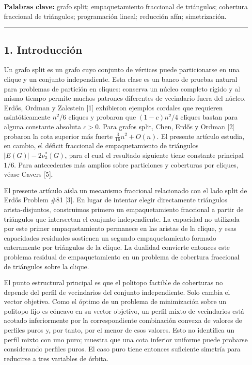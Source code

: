 \documentclass[spanish,11pt,a4paper]{article}
\begin{document}
\textbf{Palabras clave:} grafo split; empaquetamiento fraccional de
triángulos; cobertura fraccional de triángulos; programación lineal;
reducción afín; simetrización.

\begin{center}\rule{0.5\linewidth}{0.5pt}\end{center}

\subsection{1. Introducción}\label{introducciuxf3n}

Un grafo split es un grafo cuyo conjunto de vértices puede particionarse
en una clique y un conjunto independiente. Esta clase es un banco de
pruebas natural para problemas de partición en cliques: conserva un
núcleo completo rígido y al mismo tiempo permite muchos patrones
diferentes de vecindario fuera del núcleo. Erdős, Ordman y Zalcstein
{[}1{]} exhibieron ejemplos cordales que requieren asintóticamente
\(n^2/6\) cliques y probaron que \((1-c)n^2/4\) cliques bastan para
alguna constante absoluta \(c>0\). Para grafos split, Chen, Erdős y
Ordman {[}2{]} probaron la cota superior más fuerte
\(\frac{3}{16}n^2+O(n)\). El presente artículo estudia, en cambio, el
déficit fraccional de empaquetamiento de triángulos
\(|E(G)|-2\nu_3^*(G)\), para el cual el resultado siguiente tiene
constante principal \(1/6\). Para antecedentes más amplios sobre
particiones y coberturas por cliques, véase Cavers {[}5{]}.

El presente artículo aísla un mecanismo fraccional relacionado con el
lado split de Erdős Problem \#81 {[}3{]}. En lugar de intentar elegir
directamente triángulos arista-disjuntos, construimos primero un
empaquetamiento fraccional a partir de triángulos que intersectan el
conjunto independiente. La capacidad no utilizada por este primer
empaquetamiento permanece en las aristas de la clique, y esas
capacidades residuales sostienen un segundo empaquetamiento formado
enteramente por triángulos de la clique. La dualidad convierte entonces
este problema residual de empaquetamiento en un problema de cobertura
fraccional de triángulos sobre la clique.

El punto estructural principal es que el politopo factible de coberturas
no depende del perfil de vecindarios del conjunto independiente. Solo
cambia el vector objetivo. Como el óptimo de un problema de minimización
sobre un politopo fijo es cóncavo en su vector objetivo, un perfil mixto
de vecindarios está acotado inferiormente por la correspondiente
combinación convexa de valores de perfiles puros y, por tanto, por el
menor de esos valores. Esto no identifica un perfil mixto con uno puro;
muestra que una cota inferior uniforme puede probarse considerando
perfiles puros. El caso puro tiene entonces suficiente simetría para
reducirse a tres variables de órbita.
\end{document}
